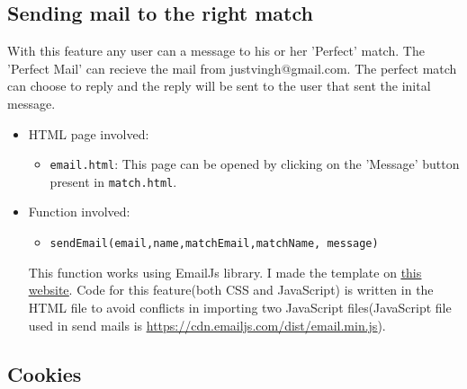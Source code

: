 \documentclass[12pt,a4paper]{article}
\begin{document}
\subsection{Sending mail to the right match}
With this feature any user can a message to his or her 'Perfect' match. The 'Perfect Mail' can recieve the mail from justvingh@gmail.com. The perfect match can choose to reply and the reply will be sent to the user that sent the inital message.\begin{itemize}
    \item HTML page involved: \begin{itemize}
        \item \texttt{email.html}: This page can be opened by clicking on the 'Message' button present in \texttt{match.html}. 
    \end{itemize}
    \item Function involved:\begin{itemize}
        \item \texttt{sendEmail(email,name,matchEmail,matchName, message)}
    \end{itemize}
This function works using EmailJs library. I made the template on \underline{\href{https://www.emailjs.com/}{this website}}. Code for this feature(both CSS and JavaScript) is written in the HTML file to avoid conflicts in importing two JavaScript files(JavaScript file used in send mails is \underline{\href{https://cdn.emailjs.com/dist/email.min.js}{https://cdn.emailjs.com/dist/email.min.js}}).      
\end{itemize}
\subsection{Cookies}
\end{document}
